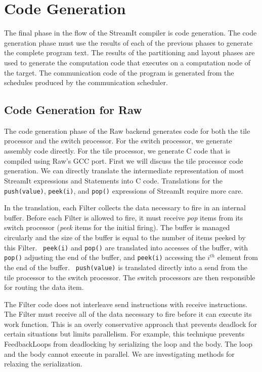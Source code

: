 \section{Code Generation}
\label{sec:codegen}

The final phase in the flow of the StreamIt compiler is code
generation.  The code generation phase must use the results of each of
the previous phases to generate the complete program text.  The
results of the partitioning and layout phases are used to generate the
computation code that executes on a computation node of the target.
The communication code of the program is generated from the schedules
produced by the communication scheduler.


\subsection{Code Generation for Raw}

The code generation phase of the Raw backend generates code for both
the tile processor and the switch processor.  For the switch
processor, we generate assembly code directly.  For the tile
processor, we generate C code that is compiled using Raw's GCC port.
First we will discuss the tile processor code generation.  We can
directly translate the intermediate representation of most StreamIt
expressions and Statements into C code.  Translations for the {\tt
push(value)}, {\tt peek(i)}, and {\tt pop()} expressions of StreamIt
require more care.


In the translation, each Filter collects the data necessary to fire in
an internal buffer.  Before each Filter is allowed to fire, it must
receive \emph{pop} items from its switch processor (\emph{peek} items for the
initial firing).  The buffer is managed circularly and the size of the
buffer is equal to the number of items peeked by this Filter.  {\tt
peek(i)} and {\tt pop()} are translated into accesses of the buffer,
with {\tt pop()} adjusting the end of the buffer, and {\tt peek(i)}
accessing the $i^{th}$ element from the end of the buffer.  {\tt
push(value)} is translated directly into a send from the tile
processor to the switch processor.  The switch processors are then
responsible for routing the data item.

The Filter code does not interleave send instructions with receive
instructions.  The Filter must receive all of the data necessary to
fire before it can execute its work function.  This is an overly
conservative approach that prevents deadlock for certain situations
but limits parallelism.  For example, this technique prevents
FeedbackLoops from deadlocking by serializing the loop and the body.  
The loop and the body cannot execute in parallel.  We are
investigating methods for relaxing the serialization.

